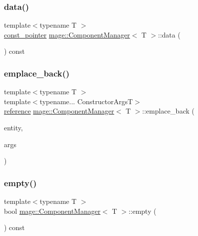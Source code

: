\subsubsection{\texorpdfstring{data()}{data()}\hspace{0.1cm}{\footnotesize\ttfamily [2/2]}}
{\footnotesize\ttfamily template$<$typename T $>$ \\
\mbox{\hyperlink{classmage_1_1_component_manager_aca0462fe048337b5453e72cb7facaf31}{const\+\_\+pointer}} \mbox{\hyperlink{classmage_1_1_component_manager}{mage\+::\+Component\+Manager}}$<$ T $>$\+::data (\begin{DoxyParamCaption}{ }\end{DoxyParamCaption}) const\hspace{0.3cm}{\ttfamily [noexcept]}}

\mbox{\label{classmage_1_1_component_manager_ad7c2c45d7c5f651144b9d62b91b2ea6d}} 
\subsubsection{\texorpdfstring{emplace\+\_\+back()}{emplace\_back()}}
{\footnotesize\ttfamily template$<$typename T $>$ \\
template$<$typename... Constructor\+ArgsT$>$ \\
\mbox{\hyperlink{classmage_1_1_component_manager_a4daeb292f527534c155e359faf7eaf80}{reference}} \mbox{\hyperlink{classmage_1_1_component_manager}{mage\+::\+Component\+Manager}}$<$ T $>$\+::emplace\+\_\+back (\begin{DoxyParamCaption}\item[{\mbox{\hyperlink{classmage_1_1_entity}{Entity}}}]{entity,  }\item[{Constructor\+ArgsT \&\&...}]{args }\end{DoxyParamCaption})}

\mbox{\label{classmage_1_1_component_manager_af5382446371a03c94301328ab768e919}} 
\subsubsection{\texorpdfstring{empty()}{empty()}}
{\footnotesize\ttfamily template$<$typename T $>$ \\
bool \mbox{\hyperlink{classmage_1_1_component_manager}{mage\+::\+Component\+Manager}}$<$ T $>$\+::empty (\begin{DoxyParamCaption}{ }\end{DoxyParamCaption}) const\hspace{0.3cm}{\ttfamily [noexcept]}}

